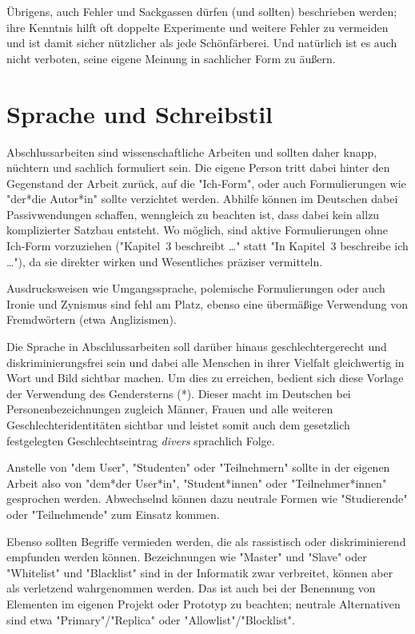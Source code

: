 Übrigens, auch Fehler und Sackgassen dürfen (und sollten) beschrieben werden;
ihre Kenntnis hilft oft doppelte Experimente und weitere Fehler zu vermeiden
und ist damit sicher nützlicher als jede Schönfärberei. Und natürlich ist es
auch nicht verboten, seine eigene Meinung in sachlicher Form zu äußern.


\section{Sprache und Schreibstil}

Abschlussarbeiten sind wissenschaftliche Arbeiten und sollten daher knapp,
nüchtern und sachlich formuliert sein. Die eigene Person tritt dabei hinter
den Gegenstand der Arbeit zurück, auf die "Ich-Form", oder auch Formulierungen
wie "der*die Autor*in" sollte verzichtet werden. Abhilfe können im Deutschen
dabei Passivwendungen schaffen, wenngleich zu beachten ist, dass dabei kein
allzu komplizierter Satzbau entsteht. Wo möglich, sind aktive Formulierungen
ohne Ich-Form vorzuziehen (\zB "Kapitel~3 beschreibt \ldots" statt "In
Kapitel~3 beschreibe ich \ldots"), da sie direkter wirken und Wesentliches
präziser vermitteln.

Ausdrucksweisen wie Umgangssprache, polemische Formulierungen oder auch
Ironie und Zynismus sind fehl am Platz, ebenso eine übermäßige Verwendung von
Fremdwörtern (etwa Anglizismen).

Die Sprache in Abschlussarbeiten soll darüber hinaus geschlechtergerecht und
diskriminierungsfrei sein und dabei alle Menschen in ihrer Vielfalt gleichwertig
in Wort und Bild sichtbar machen. Um dies zu erreichen, bedient sich diese
Vorlage der Verwendung des Gendersterns (*). Dieser macht im Deutschen bei
Personenbezeichnungen zugleich Männer, Frauen und alle weiteren
Geschlechteridentitäten sichtbar und leistet somit auch dem gesetzlich
festgelegten Geschlechtseintrag \emph{divers} sprachlich Folge.

Anstelle von "dem User", "Studenten" oder "Teilnehmern" sollte in der eigenen
Arbeit also von "dem*der User*in", "Student*innen" oder "Teilnehmer*innen"
gesprochen werden. Abwechselnd können dazu neutrale Formen wie "Studierende"
oder "Teilnehmende" zum Einsatz kommen.

Ebenso sollten Begriffe vermieden werden, die als rassistisch oder
diskriminierend empfunden werden können. Bezeichnungen wie "Master" und "Slave"
oder "Whitelist" und "Blacklist" sind in der Informatik zwar verbreitet, können
aber als verletzend wahrgenommen werden. Das ist auch bei der Benennung von
Elementen im eigenen Projekt oder Prototyp zu beachten; neutrale Alternativen
sind etwa "Primary"/"Replica" oder "Allowlist"/"Blocklist".


